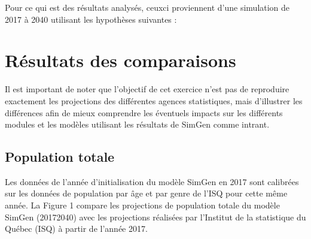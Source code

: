 \documentclass[letterpaper,10pt,french]{sphinxmanual}
\begin{document}
Pour ce qui est des résultats analysés, ceux\sphinxhyphen{}ci proviennent d’une simulation de 2017 à 2040 utilisant les hypothèses suivantes :

\begin{sphinxVerbatim}[commandchars=\\\{\}]
  
 
\end{sphinxVerbatim}


\section{Résultats des comparaisons}
\label{\detokenize{resultats:resultats-des-comparaisons}}
Il est important de noter que l’objectif de cet exercice n’est pas de reproduire exactement
les projections des différentes agences statistiques,
mais d’illustrer les différences afin de mieux comprendre les éventuels impacts
sur les différents modules et les modèles utilisant les résultats de SimGen comme intrant.


\subsection{Population totale}
\label{\detokenize{resultats:population-totale}}
\begin{figure}[htbp]
\centering

\noindent{}
\end{figure}

Les données de l’année d’initialisation du modèle SimGen en 2017 sont calibrées sur les données de population par âge et par genre de l’ISQ pour cette même année. La Figure 1 compare les projections de population totale du modèle SimGen (2017\sphinxhyphen{}2040) avec les projections réalisées par l’Institut de la statistique du Québec (ISQ) à partir de l’année 2017.
\end{document}
